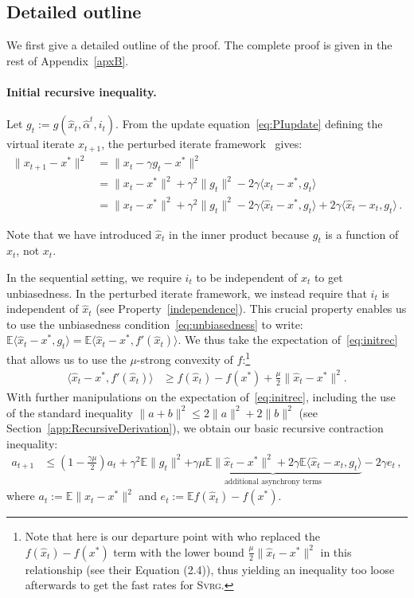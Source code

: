 \documentclass[twoside]{article}
\newcommand{\stepsize}{\gamma}
\newcommand{\strongconvex}{\mu}
\newcommand{\E}{\mathbb{E}}
\newcommand{\SVRG}{\textsc{Svrg}}
\begin{document}
\subsection{Detailed outline}\label{apxB:outline}

We first give a detailed outline of the proof. The complete proof is given in the rest of Appendix~\ref{apxB}.

\paragraph{Initial recursive inequality.}
Let $g_t := g(\hat x_t, \hat \alpha^t, i_t)$. From the update equation~\eqref{eq:PIupdate} defining the virtual iterate $x_{t+1}$, the perturbed iterate framework~\citep{mania} gives:
\begin{align}\label{eq:initrec}
\|x_{t+1} - x^*\|^2 
&= \|x_t -\stepsize g_t -x^*\|^2 
\nonumber\\
&= \|x_t -x^*\|^2 + \stepsize^2 \|g_t\|^2  -2\stepsize\langle x_t -x^*,  g_t\rangle
\nonumber\\
&= \|x_t -x^*\|^2 + \stepsize^2 \|g_t\|^2 
	-2\stepsize\langle \hat x_t -x^*,  g_t\rangle +2\stepsize\langle \hat x_t -x_t,  g_t\rangle  \, .
\end{align}

Note that we have introduced $\hat x_t$ in the inner product because $g_t$ is a function of $\hat x_t$, not $x_t$.

In the sequential setting, we require $i_t$ to be independent of $x_t$ to get unbiasedness. 
In the perturbed iterate framework, we instead require that $i_t$ is independent of $\hat x_t$ (see Property~\ref{independence}). 
This crucial property enables us to use the unbiasedness condition~\eqref{eq:unbiasedness} to write:
$\E \langle \hat x_t -x^*,  g_t\rangle 
= \E \langle \hat x_t -x^*,  f'(\hat x_t)\rangle$. We thus take the expectation of~\eqref{eq:initrec} that allows us to use the $\mu$-strong convexity of $f$:\footnote{Note that here is our departure point with \citet{mania} who replaced the $f(\hat{x}_t)-f(x^*)$ term with the lower bound $\frac{\strongconvex}{2}\|\hat x_t - x^*\|^2$ in this relationship (see their Equation (2.4)), thus yielding an inequality too loose afterwards to get the fast rates for \SVRG.} 
\begin{align} \label{eq:strongconvexity}
\langle \hat x_t -x^*,  f'(\hat x_t)\rangle &\geq f(\hat x_t) -f(x^*) +\frac{\strongconvex}{2}\|\hat x_t - x^*\|^2 . 
\end{align}
With further manipulations on the expectation of~\eqref{eq:initrec}, including the use of the standard inequality $\|a + b\|^2 \leq 2\|a\|^2 + 2\|b\|^2$ (see Section~\ref{app:RecursiveDerivation}), we obtain our basic recursive contraction inequality:
\begin{align} \label{eq:RecursiveIneq2}
a_{t+1} &\leq 
	(1 -\frac{\stepsize \strongconvex}{2}) a_t 
	+ \stepsize^2 \E \|g_t\|^2 
	\underbrace{
		+ \stepsize\strongconvex \E\|\hat x_t - x^*\|^2 
		+ 2\stepsize \E \langle \hat x_t -x_t,  g_t\rangle
	}_{\text{additional asynchrony terms}}
	-2\stepsize e_t  \, ,
\end{align}
where $a_t := \E \|x_t - x^*\|^2$ and $e_t := \E f(\hat x_t) - f(x^*)$.
\end{document}
